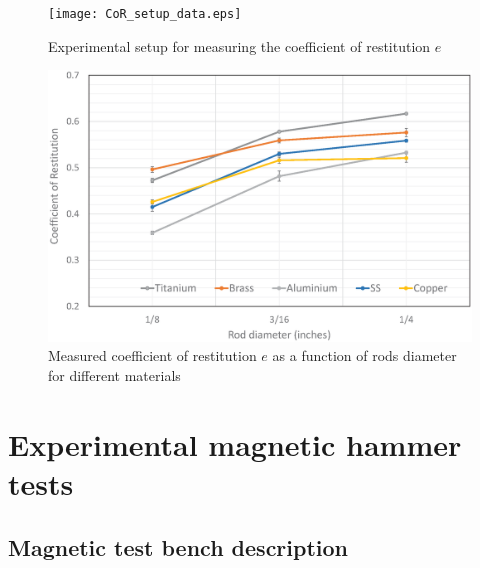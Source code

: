 \documentclass[letterpaper, 10 pt, conference]{ieeeconf}  %
\begin{document}
\begin{figure}
	\texttt{[image: CoR\_setup\_data.eps]}
	\caption{Experimental setup for measuring the coefficient of restitution $e$}
	\label{CoR_setup_data}
\end{figure}

\begin{figure}
	\includegraphics[width=\columnwidth]{CoR_measurements.eps}
	\caption{Measured coefficient of restitution $e$ as a function of rods diameter for different materials}
	\label{CoR_Results}
\end{figure}





\section{Experimental magnetic hammer tests}
\label{experiment}
\subsection{Magnetic test bench description}
\end{document}
